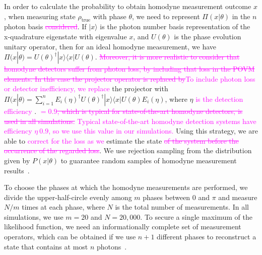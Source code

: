 \documentclass[
reprint,
superscriptaddress,
showpacs,
amsmath,
amssymb,
aps,
pra,
longbibliography
]{revtex4-1}
\providecommand{\aucmnt}[1]{#1}
\providecommand{\editcolor}[2]{\textcolor{#1}{#2}}
\providecommand{\aucmnt}[1]{}
\providecommand{\editcolor}[2]{#2}
\newcommand{\SG}[1]{\editcolor{magenta}{#1}}
\newcommand{\SGs}[1]{\aucmnt{\editcolor{magenta}{\sout{#1}}}}
\begin{document}
In order to calculate the probability to obtain homodyne measurement
outcome $x$, when measuring state $\rho_{\mathrm{true}}$ with phase
$\theta$, we need to represent $\Pi (x|\theta)$ in the $n$ photon
basis \SGs{considered}. If $|x\rangle$ is the photon number basis
representation of the x-quadrature eigenstate with eigenvalue $x$, and
$U(\theta)$ is the phase evolution unitary operator, then for an ideal
homodyne measurement, we have
$\Pi (x|\theta) = U(\theta)^{\dagger}|x\rangle \langle x|
U(\theta)$. \SGs{Moreover, it is more realistic to consider that
  homodyne detectors suffer from photon loss, by including that loss
  in the POVM elements. In this case the projector operator is
  replaced by}\SG{To include photon loss or detector inefficiency, we
  replace} the projector with
$\Pi (x|\theta) = \sum_{i=1}^{n} E_i(\eta)^{\dagger}
U(\theta)^{\dagger}|x\rangle \langle x| U(\theta) E_i(\eta)$, where
$\eta$ \SG{is the detection efficiency \cite{Lvovsky2004}}.
\SGs{$ = 0.9$, which is typical for state-of-the-art homodyne
  detectors, is used in all simulations.} \SG{Typical state-of-the-art
  homodyne detection systems have efficiency $\eta ~ 0.9$, so we use
  this value in our simulations.} Using this strategy, we are able to
\SG{correct for the loss as we} estimate the state\SGs{ of the system
  before the occurrence of the regarded loss}. We use rejection
sampling from the distribution given by $P(x|\theta)$ to guarantee
random samples of homodyne measurement results~\cite{Kennedy1980}.

To choose the phases at which the homodyne measurements are performed,
we divide the upper-half-circle evenly among $m$ phases between 0 and
$\pi$ and measure $N/m$ times at each phase, where $N$ is the total
number of measurements. In all simulations, we use $m=20$ and
$N = 20,000$. To secure a single maximum of the likelihood function,
we need an informationally complete set of measurement operators,
which can be obtained if we use $n+1$ different phases to reconstruct
a state that contains at most $n$ photons~\cite{Leonhardt1997}.
\end{document}
